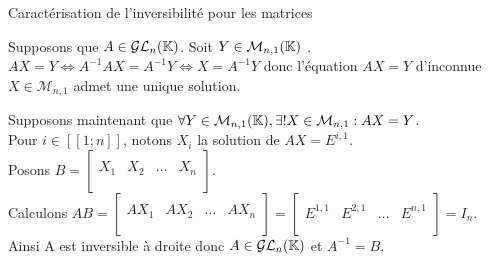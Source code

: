 \documentclass{article}
\renewenvironment{question_kholle}[2][ ]
{
	\subsection{\texorpdfstring{#2}{}}
	\notblank{#1}
	{
		\noindent #1
		\bigbreak
	}
	{}
	\begin{proof}
}
{
	\end{proof}
}
\begin{document}
\begin{question_kholle}
	[$A \in \mathcal{M}_n(\K)$ est inversible si et seulement si pour tout $Y \in \mathcal{M}_{n,1}(\K)$, l'équation $AX = Y$ d'inconnue $X \in \mathcal{M}_{n,1}$ admet une unique solution.
		\begin{equation}
			\forall A \mathcal{M}_n(\K),
			A \in \mathcal{GL}_n(\K) \iff
			\forall Y \in \mathcal{M}_{n,1}(\K), \exists ! X \in \mathcal{M}_{n,1} : AX = Y
		\end{equation}]
	{Caractérisation de l'inversibilité pour les matrices}

	Supposons que $A \in \mathcal{GL}_n(\mathbb K)$.
	Soit $Y \in \mathcal{M}_{n,1}(\K)$ \fq. \\
	$AX = Y \iff A^{-1}AX = A^{-1}Y \iff X = A^{-1}Y$ donc l'équation $AX = Y$ d'inconnue $X \in \mathcal{M}_{n,1}$ admet une unique solution.

	Supposons maintenant que $\forall Y \in \mathcal{M}_{n,1}(\mathbb K), \exists ! X \in \mathcal{M}_{n,1} : AX = Y$. \\
	Pour $i \in [\![1;n]\!]$, notons  $X_i$ la solution de $AX = E^{i,1}$. \\
	Posons $\displaystyle B = \left[ \begin{array}{c|c|c|c}
				    &     &        &     \\
				X_1 & X_2 & \ldots & X_n \\
				    &     &        &     \\
			\end{array} \right]$. \\
	Calculons $\displaystyle AB
		= \left[ \begin{array}{c|c|c|c}
				     &      &        &      \\
				AX_1 & AX_2 & \ldots & AX_n \\
				     &      &        &      \\
			\end{array} \right]
		= \left[ \begin{array}{c|c|c|c}
				        &         &        &         \\
				E^{1,1} & E^{2,1} & \ldots & E^{n,1} \\
				        &         &        &         \\
			\end{array} \right]
		= I_n$. \\
	Ainsi A est inversible à droite donc $A \in \mathcal{GL}_n(\mathbb K)$ et $A^{-1} = B$.
\end{question_kholle}
\end{document}
